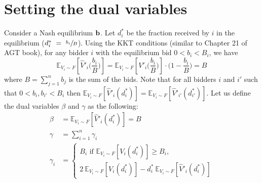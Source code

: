 \section{Setting the dual variables}

Consider a Nash equilibrium $\mathbf{b}$. Let $d_{i}^*$ be the fraction received by $i$ in the equilibrium ($d^{*}_{i}~=~\sfrac{b_{i}}{B}$).
Using the KKT conditions (similar to Chapter 21 of AGT book), for any bidder $i$ with the equilibrium bid $0 < b_{i} < B_{i}$, we have
$$
\mathbb{E}_{V_i \sim F}\left[\hat{V}'_{i}\biggl( \frac{b_{i}}{B} \biggr)\right]
=  \mathbb{E}_{V_i \sim F}\left[V'_{i}\biggl( \frac{b_{i}}{B} \biggr)\right] \cdot \biggl( 1 - \frac{b_{i}}{B} \biggr)
= B
$$
where $B = \sum_{j=1}^{n} b_{j}$ is the sum of the bids.
Note that for all bidders $i$ and $i'$ such that $0 < b_{i}, b_{i'} < B_{i}$ then
$  \mathbb{E}_{V_i \sim F}[\hat{V}'_{i}(d^{*}_{i})]  =  \mathbb{E}_{V_i \sim F}[\hat{V}'_{i'}(d_{i'}^*)]$.
%
Let us define the dual variables $\beta$ and $\gamma$ as the following:
\begin{align*}
	\beta &=  \mathbb{E}_{V_i \sim F}[\hat{V}'_{i}(d^{*}_{i})] = B\\
	\gamma &= \sum_{i=1}^{n} \gamma_{i}\\
\gamma_{i} &= \begin{cases}
	B_{i} \text{ if }  \mathbb{E}_{V_i \sim F}[V_{i}(d^{*}_{i})] \geq B_{i}, \\
	2 \ \mathbb{E}_{V_i \sim F}[V_{i}(d^{*}_{i})] - d^{*}_{i} \ \mathbb{E}_{V_i \sim F}[\hat{V}'_{i}(d^{*}_{i})]
\end{cases}
\end{align*}
